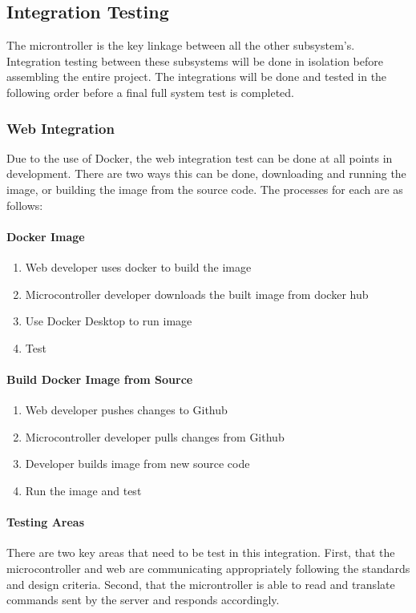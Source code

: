 \subsection{Integration Testing}
\label{sec:integration_testing}
The microntroller is the key linkage between all the other subsystem's. Integration testing between these subsystems will be done in isolation before assembling the entire project. The integrations will be done and tested in the following order before a final full system test is completed.
\subsubsection{Web Integration}
Due to the use of Docker, the web integration test can be done at all points in development. There are two ways this can be done, downloading and running the image, or building the image from the source code. The processes for each are as follows:
\paragraph{Docker Image}
\begin{enumerate}
    \item Web developer uses docker to build the image
    \item Microcontroller developer downloads the built image from docker hub
    \item Use Docker Desktop to run image
    \item Test
\end{enumerate}
\paragraph{Build Docker Image from Source}
\begin{enumerate}
    \item Web developer pushes changes to Github
    \item Microcontroller developer pulls changes from Github
    \item Developer builds image from new source code
    \item Run the image and test
\end{enumerate}
\paragraph{Testing Areas}
There are two key areas that need to be test in this integration. First, that the microcontroller and web are communicating appropriately following the standards and design criteria. Second, that the microntroller is able to read and translate commands sent by the server and responds accordingly.

